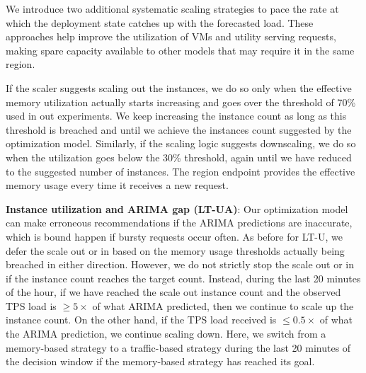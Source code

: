 We introduce two additional systematic scaling strategies to pace the rate at which the deployment state catches up with the forecasted load. 
These approaches help improve the utilization of VMs and utility serving requests, making spare capacity available to other models that may require it in the same region. 

If the scaler suggests scaling out the instances, we do so only when the effective memory utilization actually starts increasing and goes over the threshold of 70\% used in out experiments. We keep increasing the instance count as long as this threshold is breached and until we achieve the instances count suggested by the optimization model. Similarly, if the scaling logic suggests downscaling, we do so when the utilization goes below the 30\% threshold, again until we have reduced to the suggested number of instances. The region endpoint provides the effective memory usage every time it receives a new request.


\noindent \textbf{Instance utilization and ARIMA gap (LT-UA)}: 
Our optimization model can make erroneous recommendations if the ARIMA predictions are inaccurate, which is bound happen if bursty requests occur often. As before for LT-U, we defer the scale out or in based on the memory usage thresholds actually being breached in either direction. 
However, we do not strictly stop the scale out or in if the instance count reaches the target count. Instead, during the last 20 minutes of the hour, if we have reached the scale out instance count and the observed TPS load is $\geq 5\times$ of what ARIMA predicted, then we continue to scale up the instance count. On the other hand, if the TPS load received is $\leq 0.5\times$ of what the ARIMA prediction, we continue scaling down. Here, we switch from a memory-based strategy to a traffic-based strategy during the last 20 minutes of the decision window if the memory-based strategy has reached its goal.

